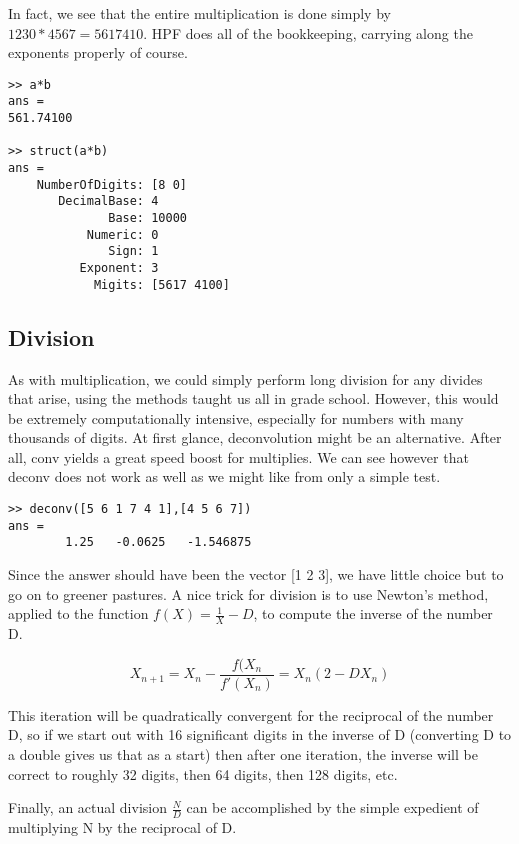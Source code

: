 \documentclass[a4paper,12pt]{article}
\begin{document}
In fact, we see that the entire multiplication is done simply by $1230*4567 = 5617410$. HPF does all of the bookkeeping, carrying along the exponents properly of course.

\begin{lstlisting}
>> a*b
ans =
561.74100

>> struct(a*b)
ans =
    NumberOfDigits: [8 0]
       DecimalBase: 4
              Base: 10000
           Numeric: 0
              Sign: 1
          Exponent: 3
            Migits: [5617 4100]
\end{lstlisting}

\subsection{Division}

As with multiplication, we could simply perform long division for any divides that arise, using the methods taught us all in grade school. However, this would be extremely computationally intensive, especially for numbers with many thousands of digits. At first glance, deconvolution might be an alternative. After all, conv yields a great speed boost for multiplies. We can see however that deconv does not work as well as we might like from only a simple test.

\begin{lstlisting}
>> deconv([5 6 1 7 4 1],[4 5 6 7])
ans =
        1.25   -0.0625   -1.546875
\end{lstlisting}

Since the answer should have been the vector [1 2 3], we have little choice but to go on to greener pastures. A nice trick for division is to use Newton's method, applied to the function $f(X) = \frac{1}{X} - D$, to compute the inverse of the number D.

\begin{equation}
    X_{n+1} = X_n - \frac{f(X_n}{f'(X_{n})} = X_n (2 - D X_n)
\end{equation}

This iteration will be quadratically convergent for the reciprocal of the number D, so if we start out with 16 significant digits in the inverse of D (converting D to a double gives us that as a start) then after one iteration, the inverse will be correct to roughly 32 digits, then 64 digits, then 128 digits, etc.

Finally, an actual division $\frac{N}{D}$ can be accomplished by the simple expedient of multiplying N by the reciprocal of D.
\end{document}

